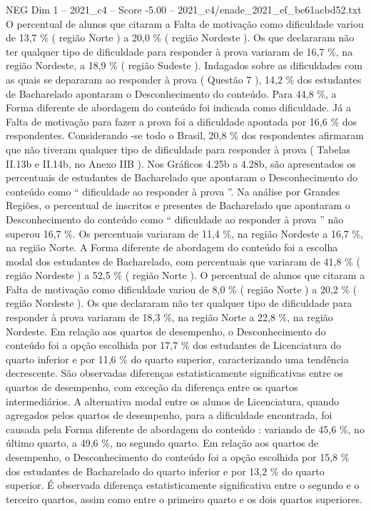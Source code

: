 \begin{textsample}{NEG Dim 1 – 2021\_c4 – Score -5.00 – 2021\_c4/enade\_2021\_ef\_be61acbd52.txt}
O percentual de alunos que citaram a Falta de motivação como dificuldade variou de 13,7 \% ( região Norte ) a 20,0 \% ( região Nordeste ).
Os que declararam não ter qualquer tipo de dificuldade para responder à prova variaram de 16,7 \%, na região Nordeste, a 18,9 \% ( região Sudeste ).
Indagados sobre as dificuldades com as quais se depararam ao responder à prova ( Questão 7 ), 14,2 \% dos estudantes de Bacharelado apontaram o Desconhecimento do conteúdo.
Para 44,8 \%, a Forma diferente de abordagem do conteúdo foi indicada como dificuldade.
Já a Falta de motivação para fazer a prova foi a dificuldade apontada por 16,6 \% dos respondentes.
Considerando -se todo o Brasil, 20,8 \% dos respondentes afirmaram que não tiveram qualquer tipo de dificuldade para responder à prova ( Tabelas II.13b e II.14b, no Anexo IIB ).
Nos Gráficos 4.25b a 4.28b, são apresentados os percentuais de estudantes de Bacharelado que apontaram o Desconhecimento do conteúdo como “ dificuldade ao responder à prova ”.
Na análise por Grandes Regiões, o percentual de inscritos e presentes de Bacharelado que apontaram o Desconhecimento do conteúdo como “ dificuldade ao responder à prova ” não superou 16,7 \%.
Os percentuais variaram de 11,4 \%, na região Nordeste a 16,7 \%, na região Norte.
A Forma diferente de abordagem do conteúdo foi a escolha modal dos estudantes de Bacharelado, com percentuais que variaram de 41,8 \% ( região Nordeste ) a 52,5 \% ( região Norte ).
O percentual de alunos que citaram a Falta de motivação como dificuldade variou de 8,0 \% ( região Norte ) a 20,2 \% ( região Nordeste ).
Os que declararam não ter qualquer tipo de dificuldade para responder à prova variaram de 18,3 \%, na região Norte a 22,8 \%, na região Nordeste.
Em relação aos quartos de desempenho, o Desconhecimento do conteúdo foi a opção escolhida por 17,7 \% dos estudantes de Licenciatura do quarto inferior e por 11,6 \% do quarto superior, caracterizando uma tendência decrescente.
São observadas diferenças estatisticamente significativas entre os quartos de desempenho, com exceção da diferença entre os quartos intermediários.
A alternativa modal entre os alunos de Licenciatura, quando agregados pelos quartos de desempenho, para a dificuldade encontrada, foi causada pela Forma diferente de abordagem do conteúdo : variando de 45,6 \%, no último quarto, a 49,6 \%, no segundo quarto.
Em relação aos quartos de desempenho, o Desconhecimento do conteúdo foi a opção escolhida por 15,8 \% dos estudantes de Bacharelado do quarto inferior e por 13,2 \% do quarto superior.
É observada diferença estatisticamente significativa entre o segundo e o terceiro quartos, assim como entre o primeiro quarto e os dois quartos superiores.

\end{textsample}
